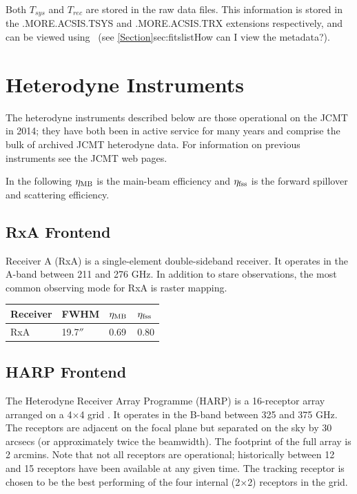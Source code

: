 \documentclass[11pt,oneside,chapters]{starlink}
\providecommand{\arcm}{\si{\arcminute}}%
\providecommand{\arcsec}{\si{\arcsecond}}%
\begin{document}
\begin{tip}
Both $T_{sys}$ and $T_{rec}$ are stored in the raw data files.
This information is stored in the .MORE.ACSIS.TSYS and .MORE.ACSIS.TRX
extensions respectively, and can be viewed using \hdstrace\ (see
\cref{Section}{sec:fitslist}{How can I view the metadata?}).
\end{tip}


\section{Heterodyne Instruments}
\label{sec:instruments}

The heterodyne instruments described below are those operational on
the JCMT in 2014; they have both been in active service for many years
and comprise the bulk of archived JCMT heterodyne data. For
information on previous instruments see the JCMT web pages.

In the following $\eta_\textnormal{MB}$ is the main-beam efficiency and
$\eta_\textnormal{fss}$ is the forward spillover and scattering efficiency.

\subsection{RxA Frontend}

Receiver A (RxA) is a single-element double-sideband receiver. It
operates in the A-band between 211 and 276 GHz. In addition to stare
observations, the most common observing mode for RxA is raster
mapping.
\begin{table}[h!]
\begin{center}
\begin{tabular}{|p{1.5cm}|p{1.2cm}|p{0.8cm}|p{0.8cm}|}
\hline
Receiver &FWHM & $\eta_\textnormal{MB}$ & $\eta_\textnormal{fss}$\\
\hline
RxA&19.7$\arcsec$&0.69 & 0.80\\
\hline
\end{tabular}
\end{center}
\end{table}

\subsection{HARP Frontend}

The Heterodyne Receiver Array Programme (HARP) is a 16-receptor array
arranged on a 4$\times$4 grid \cite{harp}. It operates in the B-band
between 325 and 375 GHz. The receptors are adjacent on the focal plane
but separated on the sky by 30 arcsecs (or approximately twice the
beamwidth). The footprint of the full array is 2 arcmins. Note that
not all receptors are operational; historically between 12 and 15
receptors have been available at any given time. The tracking receptor
is chosen to be the best performing of the four internal (2$\times$2)
receptors in the grid.
\end{document}
